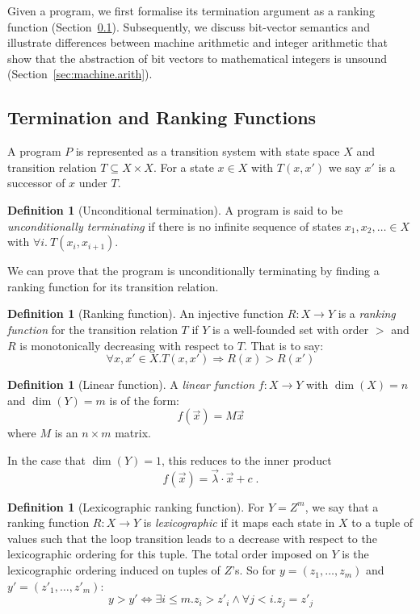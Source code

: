 \documentclass[preprint]{sigplanconf}
\theoremstyle{definition}
\newtheorem{definition}[theorem]{Definition}
\begin{document}
Given a program, we first formalise its termination argument as a ranking
function (Section~\ref{sec:ranking.functions}).  Subsequently, we discuss
bit-vector semantics and illustrate differences between machine arithmetic
and integer arithmetic that show that the abstraction of bit vectors to
mathematical integers is unsound (Section~\ref{sec:machine.arith}).

\subsection{Termination and Ranking Functions} \label{sec:ranking.functions}

A program $P$ is represented as a transition system with state space $X$ and
transition relation $T \subseteq X \times X$.  For a state
$x \in X$ with $T(x,x')$ we say $x'$ is a successor of $x$ under $T$.

\begin{definition}[Unconditional termination]
%
A program is said to be \emph{unconditionally terminating} if
there is no infinite sequence of states $x_1, x_2, \ldots \in X$ with
$\forall i.~T(x_i, x_{i+1})$.
%
\end{definition}

We can prove that the program is unconditionally terminating by
finding a ranking function for its transition relation.
%
\begin{definition}[Ranking function]
%
An injective function ${R:X\to Y}$ is a \emph{ranking function} for the
transition relation $T$ if $Y$ is a well-founded set with order $>$ and 
$R$ is monotonically decreasing with respect to $T$.  That is
to say:
$$\forall x, x' \in X. T(x, x') \Rightarrow R(x) > R(x')$$
%
\end{definition}

\begin{definition}[Linear function]
A \emph{linear function} $f: X \to Y$ 
with $\dim(X) = n$ and $\dim(Y) = m$ is of the form: $$f(\vec{x}) = M\vec{x}$$ where
$M$ is an $n \times m$ matrix.
\end{definition}

In the case that $\dim(Y) = 1$, this reduces to the inner product
%
$$f(\vec{x}) = \vec{\lambda} \cdotp \vec{x} + c \;.$$

\begin{definition}[Lexicographic ranking function]
For $Y = Z^m$, we say that a ranking function $R: X \to Y$ is \emph{lexicographic}
if it maps each state in $X$ to a tuple of values such that the loop transition leads to a decrease with
respect to the lexicographic ordering for this tuple.
The total order imposed on $Y$ is the lexicographic ordering
induced on tuples of $Z$'s.  So for $y = (z_1, \ldots, z_m)$ and
$y' = (z'_1, \ldots, z'_m)$:
\[
 y > y' \iff \exists i \leq m . z_i > z'_i \wedge \forall j < i . z_j = z'_j
\]


\end{definition}
\end{document}
